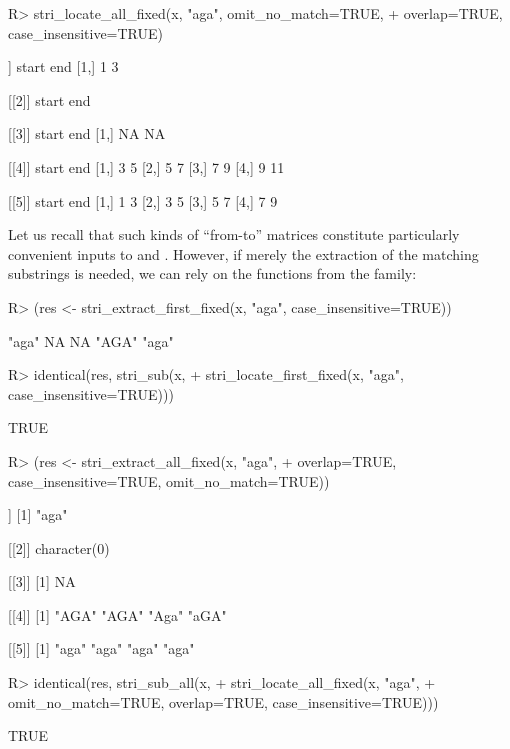 \documentclass[nojss]{jss}
\begin{document}
\begin{Schunk}
\begin{Sinput}
R> stri_locate_all_fixed(x, "aga", omit_no_match=TRUE,
+    overlap=TRUE, case_insensitive=TRUE)
\end{Sinput}
\begin{Soutput}
[[1]]
     start end
[1,]     1   3

[[2]]
     start end

[[3]]
     start end
[1,]    NA  NA

[[4]]
     start end
[1,]     3   5
[2,]     5   7
[3,]     7   9
[4,]     9  11

[[5]]
     start end
[1,]     1   3
[2,]     3   5
[3,]     5   7
[4,]     7   9
\end{Soutput}
\end{Schunk}



\medskip
Let us recall that such kinds of ``from-to'' matrices constitute particularly
convenient inputs to  and .
However, if merely the extraction of the matching substrings is needed,
we can rely on the functions from the  family:

\begin{Schunk}
\begin{Sinput}
R> (res <- stri_extract_first_fixed(x, "aga", case_insensitive=TRUE))
\end{Sinput}
\begin{Soutput}
[1] "aga" NA    NA    "AGA" "aga"
\end{Soutput}
\begin{Sinput}
R> identical(res, stri_sub(x,
+    stri_locate_first_fixed(x, "aga", case_insensitive=TRUE)))
\end{Sinput}
\begin{Soutput}
[1] TRUE
\end{Soutput}
\begin{Sinput}
R> (res <- stri_extract_all_fixed(x, "aga",
+    overlap=TRUE, case_insensitive=TRUE, omit_no_match=TRUE))
\end{Sinput}
\begin{Soutput}
[[1]]
[1] "aga"

[[2]]
character(0)

[[3]]
[1] NA

[[4]]
[1] "AGA" "AGA" "Aga" "aGA"

[[5]]
[1] "aga" "aga" "aga" "aga"
\end{Soutput}
\begin{Sinput}
R> identical(res, stri_sub_all(x,
+    stri_locate_all_fixed(x, "aga",
+      omit_no_match=TRUE, overlap=TRUE, case_insensitive=TRUE)))
\end{Sinput}
\begin{Soutput}
[1] TRUE
\end{Soutput}
\end{Schunk}
\end{document}
